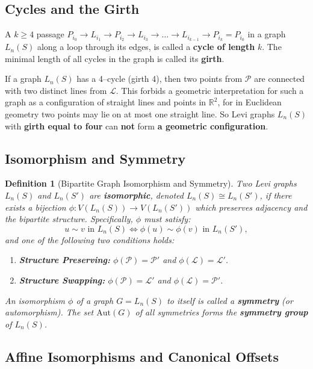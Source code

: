 \documentclass[12pt,letterpaper]{amsart}
\newtheorem{definition}{Definition}
\begin{document}
\subsection{Cycles and the Girth}
A $k\geq 4$ passage $P_{i_0}\to L_{i_1}\to P_{i_2}\to L_{i_3}\to\dots\to L_{i_{k-1}}\to P_{i_k}=P_{i_0}$ in a graph $L_n(S)$ along a loop through its edges, is called a \textbf{cycle of length} $k$. The minimal length of all cycles in the graph is called its \textbf{girth}.

If a graph $L_n(S)$ has a 4--cycle (girth 4), then two points from $\mathcal P$ are connected with two distinct lines from $\mathcal L$. This forbids a geometric interpretation for such a graph as a configuration of straight lines and points in $\mathbb R^2$, for in Euclidean geometry two points may lie on at most one straight line. So Levi graphs $L_n(S)$ with \textbf{girth equal to four} can \textbf{not} form \textbf{a geometric configuration}.

\subsection{Isomorphism and Symmetry}

\begin{definition}[Bipartite Graph Isomorphism and Symmetry]
Two Levi graphs $L_n(S)$ and $L_n(S')$ are \textbf{isomorphic}, denoted $L_n(S) \cong L_n(S')$, if there exists a bijection $\phi: V(L_n(S)) \to V(L_n(S'))$ which preserves adjacency and the bipartite structure. Specifically, $\phi$ must satisfy:
\[
u \sim v \text{ in } L_n(S) \iff \phi(u) \sim \phi(v) \text{ in } L_n(S'),
\]
and one of the following two conditions holds:
\begin{enumerate}
    \item \textbf{Structure Preserving:} $\phi(\mathcal{P}) = \mathcal{P}'$ and $\phi(\mathcal{L}) = \mathcal{L}'$.
    \item \textbf{Structure Swapping:} $\phi(\mathcal{P}) = \mathcal{L}'$ and $\phi(\mathcal{L}) = \mathcal{P}'$.
\end{enumerate}
An isomorphism $\phi$ of a graph $G=L_n(S)$ to itself is called a \textbf{symmetry} (or automorphism). The set $\mathrm{Aut}(G)$ of all symmetries forms the \textbf{symmetry group} of $L_n(S)$.
\end{definition}

\subsection{Affine Isomorphisms and Canonical Offsets}
\end{document}
